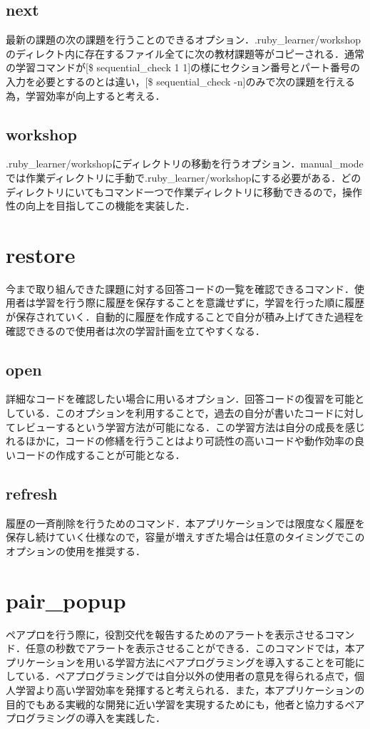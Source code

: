 \subsection{next}\label{next}
最新の課題の次の課題を行うことのできるオプション．.ruby\_learner/workshopのディレクト内に存在するファイル全てに次の教材課題等がコピーされる．通常の学習コマンドが[\$ sequential\_check 1 1]の様にセクション番号とパート番号の入力を必要とするのとは違い，[\$ sequential\_check -n]のみで次の課題を行える為，学習効率が向上すると考える．

\subsection{workshop}\label{workshop}
.ruby\_learner/workshopにディレクトリの移動を行うオプション．manual\_modeでは作業ディレクトリに手動で.ruby\_learner/workshopにする必要がある．どのディレクトリにいてもコマンド一つで作業ディレクトリに移動できるので，操作性の向上を目指してこの機能を実装した．

\section{restore}\label{restore}
今まで取り組んできた課題に対する回答コードの一覧を確認できるコマンド．使用者は学習を行う際に履歴を保存することを意識せずに，学習を行った順に履歴が保存されていく．自動的に履歴を作成することで自分が積み上げてきた過程を確認できるので使用者は次の学習計画を立てやすくなる．

\subsection{open}\label{open}
詳細なコードを確認したい場合に用いるオプション．回答コードの復習を可能としている．このオプションを利用することで，過去の自分が書いたコードに対してレビューするという学習方法が可能になる．この学習方法は自分の成長を感じれるほかに，コードの修繕を行うことはより可読性の高いコードや動作効率の良いコードの作成することが可能となる．

\subsection{refresh}\label{refresh}
履歴の一斉削除を行うためのコマンド．本アプリケーションでは限度なく履歴を保存し続けていく仕様なので，容量が増えすぎた場合は任意のタイミングでこのオプションの使用を推奨する．

\section{pair\_popup}\label{pair_popup}
ペアプロを行う際に，役割交代を報告するためのアラートを表示させるコマンド．任意の秒数でアラートを表示させることができる．このコマンドでは，本アプリケーションを用いる学習方法にペアプログラミングを導入することを可能にしている．ペアプログラミングでは自分以外の使用者の意見を得られる点で，個人学習より高い学習効率を発揮すると考えられる．また，本アプリケーションの目的でもある実戦的な開発に近い学習を実現するためにも，他者と協力するペアプログラミングの導入を実践した．

